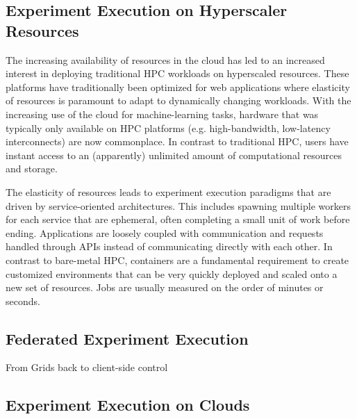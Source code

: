 \documentclass[utf8]{FrontiersinVancouver} %
\begin{document}
\subsection{Experiment Execution on Hyperscaler Resources}
The increasing availability of resources in the cloud has led to an increased
interest in deploying traditional HPC workloads on hyperscaled resources. These
platforms have traditionally been optimized for web applications where
elasticity of resources is paramount to adapt to dynamically changing workloads.
With the increasing use of the cloud for machine-learning tasks, hardware that
was typically only available on HPC platforms (e.g. high-bandwidth, low-latency
interconnects) are now commonplace. In contrast to traditional HPC, users
have instant access to an (apparently) unlimited amount of computational
resources and storage. 

The elasticity of resources leads to experiment execution paradigms that are
driven by service-oriented architectures. This includes spawning multiple
workers for each service that are ephemeral, often completing a small unit of
work before ending. Applications are loosely coupled with communication and
requests handled through APIs instead of communicating directly with each other.
In contrast to bare-metal HPC, containers are a fundamental requirement to
create customized environments that can be very quickly deployed and scaled onto
a new set of resources. Jobs are usually measured on the order of minutes or
seconds. 

\subsection{Federated Experiment Execution}

From Grids back to client-side control

\subsection{Experiment Execution on Clouds}
\end{document}
